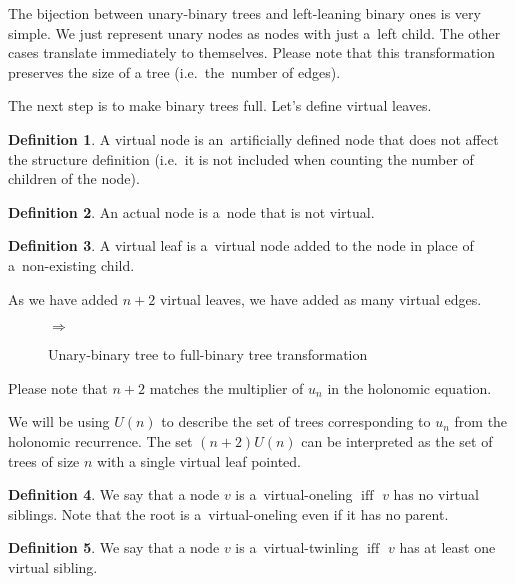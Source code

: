 \documentclass[final]{article}
\theoremstyle{definition}
\newtheorem{definition}{Definition}[subsection]
\theoremstyle{definition}
\theoremstyle{remark}
\DeclareMathOperator{\textiff}{\text{iff}}
\newcommand{\includeinlinesvg}[2]{\begin{minipage}{#1\textwidth}\end{minipage}}
\begin{document}
The bijection between unary-binary trees and left-leaning binary ones is very simple. We just represent unary nodes as nodes with just a~left child. The other cases translate immediately to themselves. Please note that this transformation preserves the size of a tree (i.e.~the~number of edges).

The next step is to make binary trees full. Let's define virtual leaves.

\begin{definition}
    A virtual node is an~artificially defined node that does not affect the structure definition (i.e.~it is not included when counting the number of children of the node).
\end{definition}

\begin{definition}
    An actual node is a~node that is not virtual.
\end{definition}

\begin{definition}
    A virtual leaf is a~virtual node added to the node in place of a~non-existing child.
\end{definition}

As we have added \(n + 2\) virtual leaves, we have added as many virtual edges.

\begin{figure}[H]
    \centering
    \includeinlinesvg{.2}{unary_binary__base}%
    \(\Rightarrow\)%
    \includeinlinesvg{.3}{unary_binary__full}
    \caption{Unary-binary tree to full-binary tree transformation}%
    \label{fig:unary_binary_transformation}
\end{figure}

Please note that \(n + 2\) matches the multiplier of \(u_n\) in the holonomic equation.

We will be using \(U(n)\) to describe the set of trees corresponding to \(u_n\) from the holonomic recurrence. The set \((n + 2) U(n)\) can be interpreted as the set of trees of size \(n\) with a single virtual leaf pointed.

\begin{definition}
    We say that a node \(v\) is a~virtual-oneling \(\textiff\) \(v\) has no virtual siblings. Note that the root is a~virtual-oneling even if it has no parent.
\end{definition}

\begin{definition}
    We say that a node \(v\) is a~virtual-twinling \(\textiff\) \(v\) has at least one virtual sibling.
\end{definition}
\end{document}
